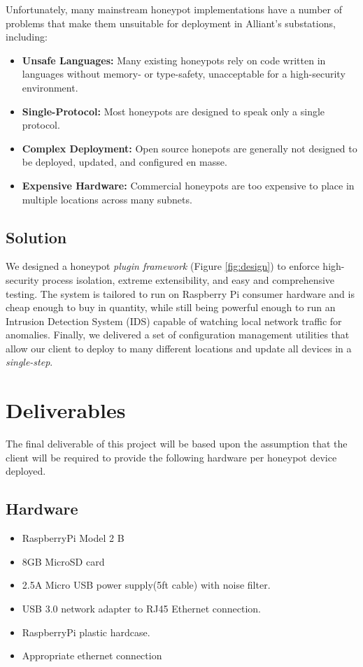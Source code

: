 Unfortunately, many mainstream honeypot implementations have a number of
problems that make them unsuitable for deployment in Alliant's substations,
including:

\begin{itemize}
\setlength{\columnsep}{0cm}
\def\columnseprulecolor{}
\item\textbf{Unsafe Languages:} Many existing honeypots rely on code written in languages without memory- or type-safety, unacceptable for a high-security environment.

\item\textbf{Single-Protocol:} Most honeypots are designed to speak only a single protocol.

\item\textbf{Complex Deployment:} Open source honepots are generally not designed to be deployed, updated, and configured en masse.

\item\textbf{Expensive Hardware:} Commercial honeypots are too expensive to place in multiple locations across many subnets.
\end{itemize}

\subsection{Solution}

We designed a honeypot \textit{plugin framework} (Figure \ref{fig:design})
to enforce high-security process isolation, extreme extensibility, and
easy and comprehensive testing. The system is tailored to run on Raspberry
Pi consumer hardware and is cheap enough to buy in quantity, while
still being powerful enough to run an Intrusion Detection System (IDS) capable
of watching local network traffic for anomalies. Finally, we delivered a set
of configuration management utilities that allow our client to deploy to
many different locations and update all devices in a \textit{single-step}.

\newpage

\section{Deliverables}

The final deliverable of this project will be based upon the assumption that the client will be required to provide the following hardware per honeypot device deployed.

\subsection{Hardware}
\begin{itemize}
\item RaspberryPi Model 2 B
\item 8GB MicroSD card
\item 2.5A Micro USB power supply(5ft cable) with noise filter.
\item USB 3.0 network adapter to RJ45 Ethernet connection.
\item RaspberryPi plastic hardcase.
\item Appropriate ethernet connection
\end{itemize}

